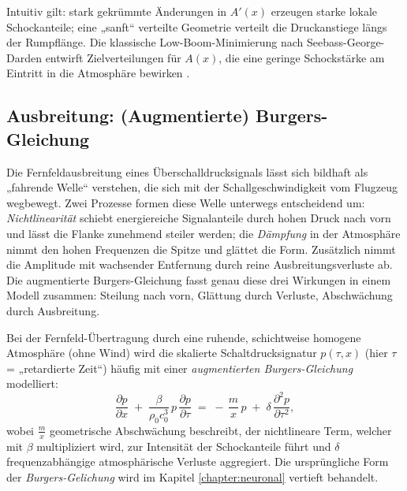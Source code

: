 Intuitiv gilt: stark gekrümmte Änderungen in $A'(x)$ erzeugen starke lokale
Schockanteile; eine „sanft“ verteilte Geometrie verteilt die Druckanstiege
längs der Rumpflänge.
Die klassische Low-Boom-Minimierung nach Seebass-George-Darden entwirft
Zielverteilungen für $A(x)$, die eine geringe Schockstärke am Eintritt in
die Atmosphäre bewirken \cite{schall:whitham,schall:seebassgeorge,schall:darden75}.

\subsection{Ausbreitung: (Augmentierte) Burgers-Gleichung}
Die Fernfeldausbreitung eines Überschalldrucksignals lässt sich bildhaft als
„fahrende Welle“ verstehen, die sich mit der Schallgeschwindigkeit vom
Flugzeug wegbewegt.
Zwei Prozesse formen diese Welle unterwegs entscheidend um:
\emph{Nichtlinearität} schiebt energiereiche Signalanteile durch hohen
Druck nach vorn und lässt die Flanke zunehmend steiler werden;
die \emph{Dämpfung} in der Atmosphäre nimmt den hohen Frequenzen die Spitze
und glättet die Form.
Zusätzlich nimmt die Amplitude mit wachsender Entfernung durch reine
Ausbreitungsverluste ab.
Die augmentierte Burgers-Gleichung fasst genau diese drei
Wirkungen in einem Modell zusammen: Steilung nach vorn, Glättung durch
Verluste, Abschwächung durch Ausbreitung.

Bei der Fernfeld-Übertragung durch eine ruhende, schichtweise homogene
Atmosphäre (ohne Wind) wird die skalierte Schaltdrucksignatur $p(\tau,x)$
(hier $\tau$ = „retardierte Zeit“) häufig mit einer
\emph{augmentierten Burgers-Gleichung} modelliert:
\begin{equation}
  \frac{\partial p}{\partial x}
  \;+\;\frac{\beta}{\rho_0 c_0^{3}}\,p\,\frac{\partial p}{\partial \tau}
  \;=\;
  -\,\frac{m}{x}\,p
  \;+\;\delta\,\frac{\partial^2 p}{\partial \tau^2},
  \label{eq:aug-burgers}
\end{equation}
wobei $\frac{m}{x}$ geometrische Abschwächung beschreibt, der nichtlineare
Term, welcher mit $\beta$ multipliziert wird, zur Intensität der Schockanteile
führt und $\delta$ frequenzabhängige atmosphärische Verluste aggregiert.
Die ursprüngliche Form der \emph{Burgers-Gelichung} wird im Kapitel
\ref{chapter:neuronal} vertieft behandelt.

